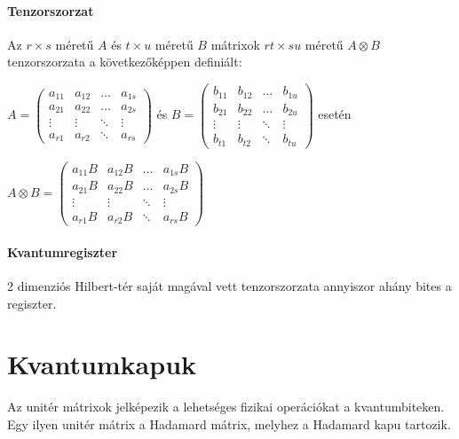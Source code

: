 \paragraph{Tenzorszorzat} Az $r \times s$ méretű $A$ és $t \times u$ méretű $B$
mátrixok $rt \times su$ méretű $A \otimes B$ tenzorszorzata a következőképpen
definiált:

\begin{center}
  $A = \begin{pmatrix}
      a_{11} & a_{12} & \dots  & a_{1s} \\
      a_{21} & a_{22} & \dots  & a_{2s} \\
      \vdots & \vdots & \ddots & \vdots \\
      a_{r1} & a_{r2} & \ddots & a_{rs}
    \end{pmatrix}
  $
  és
  $B = \begin{pmatrix}
      b_{11} & b_{12} & \dots  & b_{1u} \\
      b_{21} & b_{22} & \dots  & b_{2u} \\
      \vdots & \vdots & \ddots & \vdots \\
      b_{t1} & b_{t2} & \ddots & b_{tu}
    \end{pmatrix}
  $ esetén
\end{center}

\begin{center}
  $A \otimes B = \begin{pmatrix}
      a_{11}B & a_{12}B & \dots  & a_{1s}B \\
      a_{21}B & a_{22}B & \dots  & a_{2s}B \\
      \vdots  & \vdots  & \ddots & \vdots  \\
      a_{r1}B & a_{r2}B & \ddots & a_{rs}B
    \end{pmatrix}
  $
\end{center}


\paragraph{Kvantumregiszter}

2 dimenziós Hilbert-tér saját magával vett tenzorszorzata annyiszor ahány bites
a regiszter.

\section{Kvantumkapuk}

Az unitér mátrixok jelképezik a lehetséges fizikai operációkat a
kvantumbiteken. Egy ilyen unitér mátrix a Hadamard mátrix, melyhez a Hadamard
kapu tartozik.

